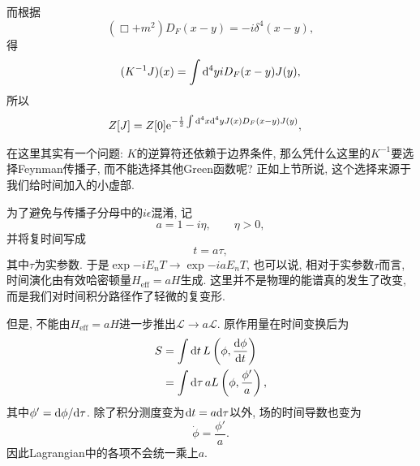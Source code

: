 而根据
\begin{equation}
    (\Box+m^2)D_F(x-y)=-i\delta^4(x-y),
\end{equation}
得
\begin{equation}
    (K^{-1}J)(x)=\int\mathrm d^4y iD_F(x-y)J(y),
\end{equation}
所以
\begin{align}
    Z[J]&=Z[0]\mathrm e^{-\frac12\int\mathrm d^4x\mathrm d^4y J(x)D_F(x-y)J(y)},
\end{align}
\begin{example}
    在这里其实有一个问题: $K$的逆算符还依赖于边界条件, 那么凭什么这里的$K^{-1}$要选择Feynman传播子, 而不能选择其他Green函数呢? 正如上节所说, 这个选择来源于我们给时间加入的小虚部.

    为了避免与传播子分母中的$i\epsilon$混淆, 记
    \begin{equation}
        a=1-i\eta,\qquad \eta>0,
    \end{equation}
    并将复时间写成
    \begin{equation}
        t=a\tau,
    \end{equation}
    其中$\tau$为实参数. 于是$\exp{-iE_nT}\to\exp{-iaE_nT}$, 也可以说, 相对于实参数$\tau$而言, 时间演化由有效哈密顿量$H_{\mathrm{eff}}=aH$生成. 这里并不是物理的能谱真的发生了改变, 而是我们对时间积分路径作了轻微的复变形.

    但是, 不能由$H_{\mathrm{eff}}=aH$进一步推出$\mathcal L\to a\mathcal L$. 原作用量在时间变换后为
    \begin{align}
        S
        &=\int\mathrm d t\,L\left(\phi,\frac{\mathrm d\phi}{\mathrm d t}\right)\notag\\
        &=\int\mathrm d\tau\,aL\left(\phi,\frac{\phi'}a\right),
    \end{align}
    其中$\phi'=\mathrm d\phi/\mathrm d\tau$. 除了积分测度变为$\mathrm d t=a\mathrm d\tau$以外, 场的时间导数也变为
    \begin{equation}
        \dot\phi=\frac{\phi'}a.
    \end{equation}
    因此Lagrangian中的各项不会统一乘上$a$.


\end{example}
